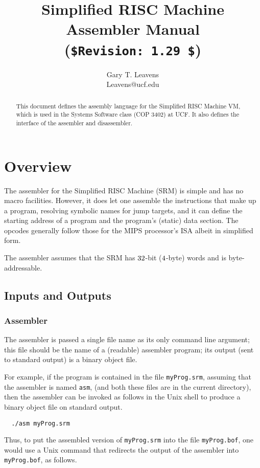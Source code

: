 \documentclass[11pt,letterpaper]{article}
\title{Simplified RISC Machine Assembler Manual \\
       (\lstinline!$Revision: 1.29 $!)}
\author{Gary T. Leavens \\
        Leavens@ucf.edu}
\begin{document}
\maketitle
\begin{abstract}
This document defines the assembly language for the
Simplified RISC Machine VM, which is used in the Systems Software
class (COP 3402) at UCF.
It also defines the interface of the assembler and disassembler.
\end{abstract}

\section{Overview}

The assembler for the Simplified RISC Machine (SRM) is simple and has
no macro facilities. However, it does let one assemble the
instructions that make up a program, resolving symbolic names for jump targets,
and it can define the starting
address of a program and the program's (static) data section.
The opcodes generally follow those for the MIPS processor's ISA
\cite{Kane-Heinrich92} albeit in simplified form.

The assembler assumes that the SRM has $32$-bit ($4$-byte)
words and is byte-addressable.

\subsection{Inputs and Outputs}

\subsubsection{Assembler}

The assembler is passed a single file name as its only command line argument;
this file should be the name of a (readable) assembler program;
its output (sent to standard output) is a binary object file.

For example, if the program is contained in the file
\texttt{myProg.srm}, assuming that the assembler is named \texttt{asm},
(and both these files are in the current directory), then the assembler
can be invoked as follows in the Unix shell to produce a binary object file on standard output.
\begin{lstlisting}
  ./asm myProg.srm
\end{lstlisting}

Thus, to put the assembled version of \texttt{myProg.srm} into the file \texttt{myProg.bof},
one would use a Unix command that redirects the output of the assembler into \texttt{myProg.bof}, as follows.
\end{document}

